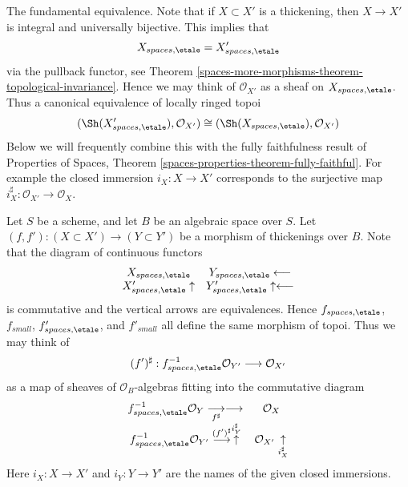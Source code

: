 The fundamental equivalence.
Note that if $X \subset X'$ is a thickening, then $X \to X'$
is integral and universally bijective. This implies that
\begin{equation}
\label{equation-equivalence-etale-spaces}
X_{spaces, \etale} = X'_{spaces, \etale}
\end{equation}
via the pullback functor, see
Theorem \ref{spaces-more-morphisms-theorem-topological-invariance}.
Hence we may think of $\mathcal{O}_{X'}$ as a sheaf on
$X_{spaces, \etale}$. Thus a canonical equivalence
of locally ringed topoi
\begin{equation}
\label{equation-fundamental-equivalence}
(\Sh(X'_{spaces, \etale}), \mathcal{O}_{X'})
\cong
(\Sh(X_{spaces, \etale}), \mathcal{O}_{X'})
\end{equation}
Below we will frequently combine this with the fully faithfulness result of
Properties of Spaces, Theorem \ref{spaces-properties-theorem-fully-faithful}.
For example the closed immersion $i_X : X \to X'$ corresponds
to the surjective map $i_X^\sharp : \mathcal{O}_{X'} \to \mathcal{O}_X$.

\medskip\noindent
Let $S$ be a scheme, and let $B$ be an algebraic space over $S$.
Let $(f, f') : (X \subset X') \to (Y \subset Y')$ be a morphism of
thickenings over $B$. Note that the diagram of continuous functors
$$
\begin{array}{cc}X_{spaces, \etale} & Y_{spaces, \etale} \longleftarrow \\ X'_{spaces, \etale} \uparrow & Y'_{spaces, \etale} \uparrow\longleftarrow\end{array}
$$
is commutative and the vertical arrows are equivalences. Hence
$f_{spaces, \etale}$, $f_{small}$,
$f'_{spaces, \etale}$, and $f'_{small}$
all define the same morphism of topoi. Thus we may think of
$$
(f')^\sharp :
f_{spaces, \etale}^{-1}\mathcal{O}_{Y'}
\longrightarrow
\mathcal{O}_{X'}
$$
as a map of sheaves of $\mathcal{O}_B$-algebras fitting into the commutative
diagram
$$
\begin{array}{cc}f_{spaces, \etale}^{-1}\mathcal{O}_Y \underset{f^\sharp}{\longrightarrow}\longrightarrow & \mathcal{O}_X \\ f_{spaces, \etale}^{-1}\mathcal{O}_{Y'} \overset{(f')^\sharp}{\longrightarrow}\overset{i_Y^\sharp}{\uparrow} & \mathcal{O}_{X'} \underset{i_X^\sharp}{\uparrow}\end{array}
$$
Here $i_X : X \to X'$ and $i_Y : Y \to Y'$ are the names of the given
closed immersions.

